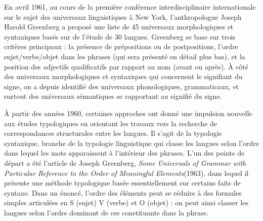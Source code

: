 En avril 1961, au cours de la première conférence interdisciplinaire internationale sur le sujet des universaux linguistiques à New York, l’anthropologue Joseph Harold Greenberg a proposé une liste de 45 universaux morphologiques et syntaxiques basés sur de l’étude de 30 langues. Greenberg se base sur trois critères principaux : la présence de prépositions ou de postpositions, l’ordre sujet/verbe/objet dans les phrases (qui sera présenté en détail plus bas), et la position des adjectifs qualificatifs par rapport au nom (avant ou après). À côté des universaux morphologiques et syntaxiques qui concernent le signifiant du signe, on a depuis identifié des universaux phonologiques, grammaticaux, et surtout des universaux sémantiques se rapportant au signifié du signe.

À partir des années 1960, certaines approches ont donné une impulsion nouvelle aux études typologiques en orientant les travaux vers la recherche de correspondances structurales entre les langues. Il s’agit de la typologie syntaxique, branche de la typologie linguistique qui classe les langues selon l’ordre dans lequel les mots apparaissent à l’intérieur des phrases. L’un des points de départ a été l’article de Joseph Greenberg, \textit{Some Universals of Grammar with Particular Reference to the Order of Meaningful Elements}(1963), dans lequel il présente une méthode typologique basée essentiellement sur certains faits de syntaxe. Dans un énoncé, l’ordre des éléments peut se réduire à des formules simples articulées en S (sujet) V (verbe) et O (objet) : on peut ainsi classer les langues selon l’ordre dominant de ces constituants dans la phrase.

